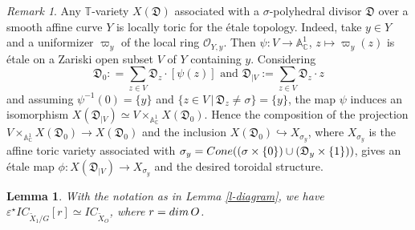 \documentclass[11pt, reqno]{amsart}
\theoremstyle{plain}
\newtheorem{lemma}[theorem]{Lemma}
\theoremstyle{definition}
\theoremstyle{remark}
\newtheorem{remark}[theorem]{Remark}
\begin{document}
\begin{remark}\label{rem-keyetale-struct-tor}
Any $\mathbb{T}$-variety $X(\mathfrak{D})$ associated with a $\sigma$-polyhedral divisor $\mathfrak{D}$ over a smooth affine curve $Y$ is locally toric for the \'etale topology. Indeed, take $y\in Y$ and  a uniformizer $\varpi_{y}$ of the local ring  $\mathcal{O}_{Y, y}$. 
Then
$\psi: V\rightarrow \mathbb{A}^{1}_{\mathbb{C}}$, $z\mapsto \varpi_{y}(z)$ is \'etale on a Zariski open subset 
$V$ of $Y$ containing $y$. Considering
$$\mathfrak{D}_{0}: =  \sum_{z\in V} \mathfrak{D}_{z}\cdot [\psi(z)]\text{ and } \mathfrak{D}_{|V} :=  \sum_{z\in V}\mathfrak{D}_{z}\cdot z$$
and assuming $\psi^{-1}(0) =  \{y\}$ and $\{z\in V\,|\, \mathfrak{D}_{z}\neq \sigma\} =  \{y\}$, the map $\psi$ induces an isomorphism $X(\mathfrak{D}_{|V})\simeq V\times_{\mathbb{A}^{1}_{\mathbb{C}}}X(\mathfrak{D}_{0})$. Hence the composition of the projection $ V\times_{\mathbb{A}^{1}_{\mathbb{C}}}X(\mathfrak{D}_{0})\rightarrow X(\mathfrak{D}_{0})$ and the inclusion $ X(\mathfrak{D}_{0})\hookrightarrow X_{\sigma_{y}}$,
where $X_{\sigma_{y}}$ is the affine toric variety associated with $\sigma_{y} =  {\rm Cone}((\sigma\times\{0\})\cup (\mathfrak{D}_{y}\times\{1\}))$, gives an \'etale map $\phi: X(\mathfrak{D}_{|V})\rightarrow X_{\sigma_{y}}$ and the desired toroidal structure.
\end{remark}
\begin{lemma}\label{l-Seifert-pullback}
With the notation as in Lemma \ref{l-diagram}, we have $\varepsilon^{\star}IC_{\widetilde{X}_{1}/G}[r]\simeq IC_{\widetilde{X}_{O}}$, where $r  =  {\rm dim}\, O$.
\end{lemma}
\end{document}
